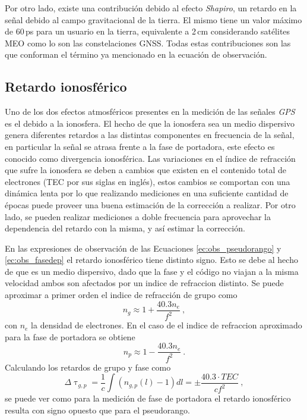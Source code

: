 \documentclass[a4paper,12pt,oneside,onecolumn,final,openright]{book}%
\begin{document}
	 Por otro lado, existe una contribución debido al efecto \textit{Shapiro}, un retardo en la señal debido al campo gravitacional de la tierra. El mismo tiene un valor máximo de 60\,ps para un usuario en la tierra, equivalente a 2\,cm considerando satélites MEO como lo son las constelaciones GNSS. Todas estas contribuciones son las que conforman el término ya mencionado en la ecuación de observación.
	 
	 
\subsection*{Retardo ionosférico}
	Uno de los dos efectos atmosféricos presentes en la medición de las señales \textit{GPS} es el debido a la ionosfera. El hecho de que la ionosfera sea un medio dispersivo genera diferentes retardos a las distintas componentes en frecuencia de la señal, en particular la señal se atrasa frente a la fase de portadora, este efecto es conocido como divergencia ionosférica. Las variaciones en el índice de refracción que sufre la ionosfera se deben a cambios que existen en el contenido total de electrones (TEC por sus siglas en inglés), estos cambios se comportan con una dinámica lenta por lo que realizando mediciones en una suficiente cantidad de épocas puede proveer una buena estimación de la corrección a realizar. Por otro lado, se pueden realizar mediciones a doble frecuencia para aprovechar la dependencia del retardo con la misma, y así estimar la corrección. 
	
	En las expresiones de observación de las Ecuaciones \eqref{ec:obs_pseudorango} y \eqref{ec:obs_fasedep} el retardo ionosférico tiene distinto signo. Esto se debe al hecho de que es un medio dispersivo, dado que la fase y el código no viajan a la misma velocidad ambos son afectados por un indice de refraccion distinto. Se puede aproximar a primer orden el indice de refracción de grupo como 
\begin{equation}
	n_g \approx 1 + \dfrac{40.3n_e}{f^2} \ ,
\end{equation}
	con $n_e$ la densidad de electrones. En el caso de el indice de refraccion aproximado para la fase de portadora se obtiene
\begin{equation}
	n_p \approx 1 - \dfrac{40.3n_e}{f^2} \ .
\end{equation}
	Calculando los retardos de grupo y fase como 
\begin{equation}
	\Delta\uptau_{g,p} = \dfrac{1}{c}\int\left( n_{g,p}(l) - 1 \right)dl = \pm \dfrac{40.3\cdot TEC}{cf^2} \ ,
\end{equation}
	se puede ver como para la medición de fase de portadora el retardo ionosférico resulta con signo opuesto que para el pseudorango. 
	
\end{document}
